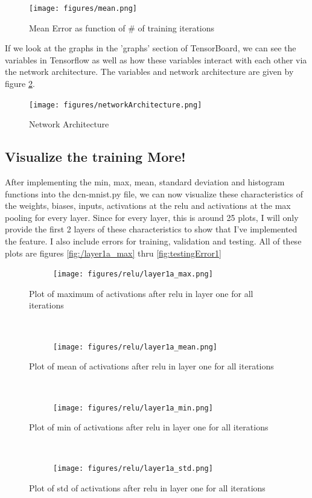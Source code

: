 \documentclass[]{article}
\begin{document}
\begin{figure}[ht]
        \centering
        \texttt{[image: figures/mean.png]}
    \caption{Mean Error as function of \# of training iterations}
 \label{fig:MeanError}
\end{figure}

If we look at the graphs in the 'graphs' section of TensorBoard, we can see the variables in Tensorflow as well as how these variables interact with each other via the network architecture. The variables and network architecture are given by figure \ref{fig:network}.

\begin{figure}[ht]
        \centering
        \texttt{[image: figures/networkArchitecture.png]}
    \caption{Network Architecture}
 \label{fig:network}
\end{figure}


\subsection{Visualize the training More!}
After implementing the min, max, mean, standard deviation and histogram functions into the dcn-mnist.py file, we can now visualize these characteristics of the weights, biases, inputs, activations at the relu and activations at the max pooling for every layer. Since for every layer, this is around 25 plots, I will only provide the first 2 layers of these characteristics to show that I've implemented the feature. I also include errors for training, validation and testing. All of these plots are figures \ref{fig:/layer1a_max} thru \ref{fig:testingError1}


\begin{figure}[ht]
    \centering
    \begin{subfigure}
        \centering
        \texttt{[image: figures/relu/layer1a\_max.png]}
    \end{subfigure}%
    \caption{Plot of maximum of activations after relu in layer one for all iterations}
 \label{fig:/layer1a_max}
    ~ 
    \centering
    \begin{subfigure}
        \centering
        \texttt{[image: figures/relu/layer1a\_mean.png]}
    \end{subfigure}%
    \caption{Plot of mean of activations after relu in layer one for all iterations}
 \label{fig:/layer1a_mean}
    ~ 
    \centering
    \begin{subfigure}
        \centering
        \texttt{[image: figures/relu/layer1a\_min.png]}
    \end{subfigure}%
    \caption{Plot of min of activations after relu in layer one for all iterations}
 \label{fig:/layer1a_min}
    ~ 
    \centering
    \begin{subfigure}
        \centering
        \texttt{[image: figures/relu/layer1a\_std.png]}
    \end{subfigure}%
    \caption{Plot of std of activations after relu in layer one for all iterations}
 \label{fig:/layer1a_std}
\end{figure}
\end{document}
